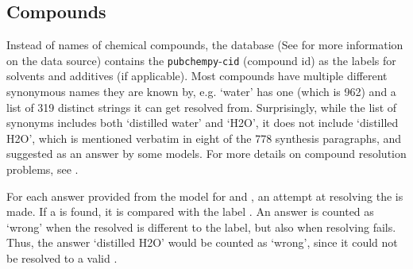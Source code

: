 \subsection{Compounds}\label{sub:compsolv}
Instead of names of chemical compounds, the database (See  for more information on the data source) contains the \texttt{pubchempy}-\texttt{cid} (compound id) as the labels for solvents and additives (if applicable).
Most compounds have multiple different synonymous names they are known by, e.g. `water' has one \cid (which is 962) and a list of 319 distinct strings it can get resolved from.
Surprisingly, while the list of synonyms includes both `distilled water' and `H2O', it does not include `distilled H2O', which is mentioned verbatim in eight of the 778 synthesis paragraphs, and suggested as an answer by some models.
For more details on compound resolution problems, see .

For each answer provided from the model for \tadd and \tsolv, an attempt at resolving the \cid is made.
If a \cid is found, it is compared with the label \cid.
An answer is counted as `wrong' when the resolved \cid is different to the label, but also when resolving fails.
Thus, the answer `distilled H2O' would be counted as `wrong', since it could not be resolved to a valid \cid.



